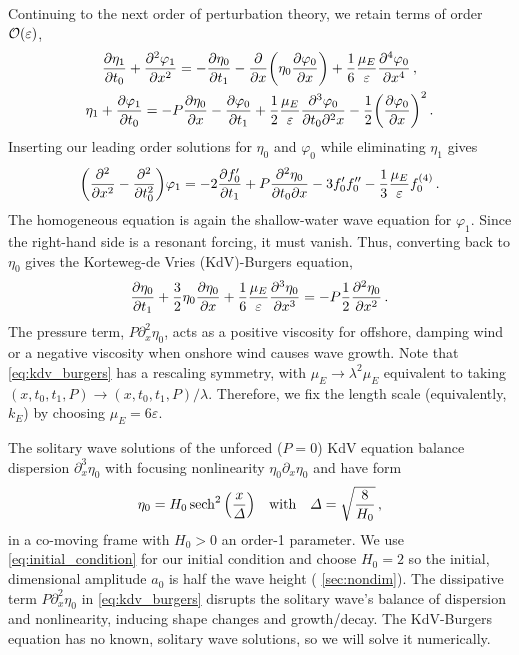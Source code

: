 \documentclass{jfm}
\renewcommand*{\epsilon}{\varepsilon}
\begin{document}
Continuing to the next order of perturbation theory, we retain terms of
order $\order{\epsilon}$,
\begin{gather}
    \pdv{\eta_1}{t_0} + \pdv[2]{\varphi_{1}}{x} =
      -\pdv{\eta_0}{t_1} - \pdv{x} \pqty{\eta_0 \pdv{\varphi_0}{x}} +
      \frac{1}{6} \frac{\mu_E}{\epsilon} \pdv[4]{\varphi_0}{x} \,,
  \\
    \eta_1 + \pdv{\varphi_1}{t_0} = -P \pdv{\eta_0}{x} -\pdv{\varphi_0}{t_1}
      + \frac{1}{2} \frac{\mu_E}{\epsilon} \frac{\partial^3 \varphi_0}
        {\partial t_0 \partial^2 x}
      - \frac{1}{2} \pqty{ \pdv{\varphi_0}{x} }^2
  \,.
\end{gather}
Inserting our leading order solutions for $\eta_0$ and $\varphi_0$ while
eliminating $\eta_1$ gives
\begin{equation}
  \pqty{\pdv[2]{x} - \pdv[2]{t_0}} \varphi_1 = -2 \pdv{f_0'}{t_1} +
    P\pdv{\eta_0}{t_0}{x} - 3 f_0' f_0'' - \frac{1}{3} \frac{\mu_E}{\epsilon}
    f_0^{(4)} \,.
\end{equation}
The homogeneous equation is again the shallow-water wave equation for
$\varphi_1$.
Since the right-hand side is a resonant forcing, it must vanish.
Thus, converting back to $\eta_0$ gives the Korteweg-de Vries
(KdV)-Burgers equation,
\begin{equation}
  \pdv{\eta_0}{t_1} + \frac{3}{2}
    \eta_0 \pdv{\eta_0}{x} + \frac{1}{6} \frac{\mu_E}{\epsilon}
    \pdv[3]{\eta_0}{x} = -P \frac{1}{2} \pdv[2]{\eta_0}{x} \,.
  \label{eq:kdv_burgers}
\end{equation}
The pressure term, $P \partial^2_x \eta_0$, acts as a positive viscosity
for offshore, damping wind or a negative viscosity when onshore wind
causes wave growth.
Note that \cref{eq:kdv_burgers} has a rescaling symmetry, with $\mu_E
\to \lambda^2 \mu_E$ equivalent to taking $(x,t_0,t_1,P) \to
(x,t_0,t_1,P)/\lambda$.
Therefore, we fix the length scale (equivalently, $k_E$) by choosing
$\mu_E = 6 \epsilon$.

The solitary wave solutions of the unforced ($P=0$) KdV equation
balance dispersion $\partial_x^3 \eta_0$ with focusing nonlinearity
$\eta_0 \partial_x \eta_0$ and have form~\citep[\eg][]{mei2005nonlinear}
\begin{equation}
  \eta_0 = H_0 \sech^2\pqty{\frac{x}{\Delta}}
  \qq{with}
  \Delta = \sqrt{\frac{8}{H_0}} \,,
  \label{eq:initial_condition}
\end{equation}
in a co-moving frame with $H_0>0$ an order-1 parameter.
We use \cref{eq:initial_condition} for our initial condition and choose
$H_0 = 2$ so the initial, dimensional amplitude $a_0$ is half the wave
height (\cf{} \cref{sec:nondim}).
The dissipative term $P \partial_x^2 \eta_0$ in \cref{eq:kdv_burgers}
disrupts the solitary wave's balance of dispersion and nonlinearity,
inducing shape changes and growth/decay.
The KdV-Burgers equation has no known, solitary wave solutions, so we
will solve it numerically.
\end{document}
